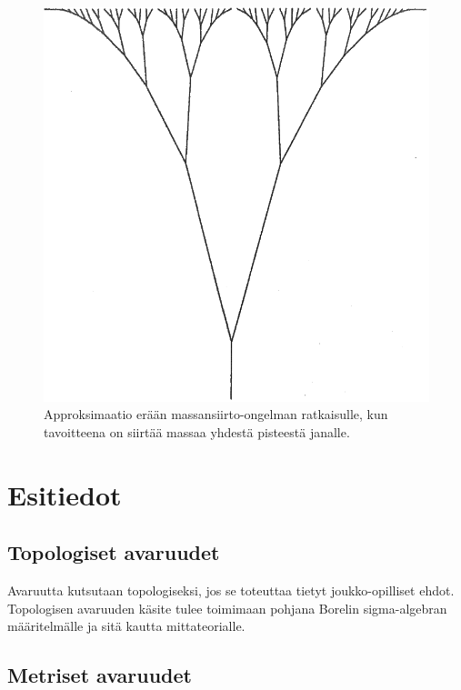 \documentclass[12pt,oneside,a4paper]{amsbook} %
\begin{document}
\begin{figure}
    \centering
    \includegraphics[scale=0.25]{graphics/johdanto_branched.png}
    \caption{Approksimaatio erään massansiirto-ongelman ratkaisulle, kun tavoitteena on siirtää massaa yhdestä pisteestä janalle. \cite[s. 166]{optimal}}
    \label{fig:branched}
\end{figure}






\chapter{Esitiedot}

\section{Topologiset avaruudet}
Avaruutta kutsutaan topologiseksi, jos se toteuttaa tietyt joukko-opilliset ehdot. Topologisen avaruuden käsite tulee toimimaan pohjana Borelin sigma-algebran määritelmälle ja sitä kautta mittateorialle.

\section{Metriset avaruudet}
\end{document}

